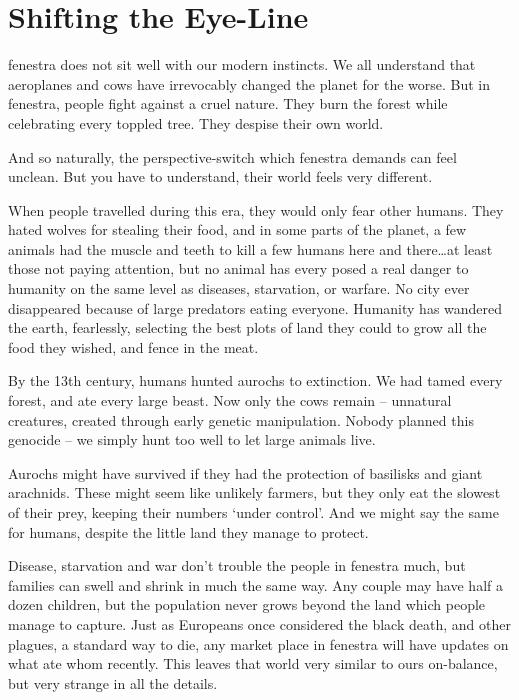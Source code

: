 \section*{Shifting the Eye-Line}

\begin{multicols}{2}

\noindent
\Gls{fenestra} does not sit well with our modern instincts.
We all understand that aeroplanes and cows have irrevocably changed the planet for the worse.
But in \gls{fenestra}, people fight against a cruel nature.
They burn the forest while celebrating every toppled tree.
They despise their own world.

And so naturally, the perspective-switch which \gls{fenestra} demands can feel unclean.
But you have to understand, their world feels very different.

When people travelled during this era, they would only fear other humans.
They hated wolves for stealing their food, and in some parts of the planet, a few animals had the muscle and teeth to kill a few humans here and there\ldots at least those not paying attention, but no animal has every posed a real danger to humanity on the same level as diseases, starvation, or warfare.
No city ever disappeared because of large predators eating everyone.
Humanity has wandered the earth, fearlessly, selecting the best plots of land they could to grow all the food they wished, and fence in the meat.

By the 13th century, humans hunted aurochs to extinction.
We had tamed every forest, and ate every large beast.
Now only the cows remain -- unnatural creatures, created through early genetic manipulation.
Nobody planned this genocide -- we simply hunt too well to let large animals live.

Aurochs might have survived if they had the protection of basilisks and giant arachnids.
These might seem like unlikely farmers, but they only eat the slowest of their prey, keeping their numbers `under control'.
And we might say the same for humans, despite the little land they manage to protect.

Disease, starvation and war don't trouble the people in \gls{fenestra} much, but families can swell and shrink in much the same way.
Any couple may have half a dozen children, but the population never grows beyond the land which people manage to capture.
Just as Europeans once considered the black death, and other plagues, a standard way to die, any market place in \gls{fenestra} will have updates on what ate whom recently.
This leaves that world very similar to ours on-balance, but very strange in all the details.


\end{multicols}
